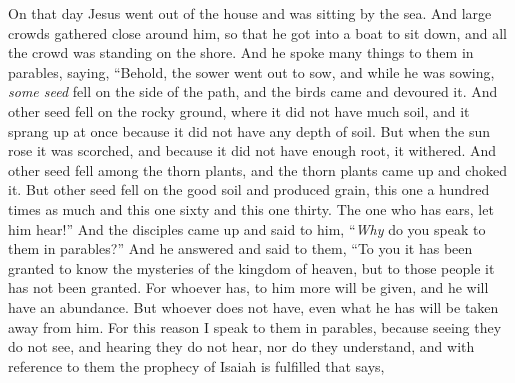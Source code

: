 \begin{biblechapter} %
 On that day Jesus went out of the house and was sitting by the sea.
\verse And large crowds gathered close around him, so that he got into a boat to sit down, and all the crowd was standing on the shore.
\verse And he spoke many things to them in parables, saying, “Behold, the sower went out to sow,
\verse and while he was sowing, \textit{some seed} fell on the side of the path, and the birds came and devoured it.
\verse And other seed fell on the rocky ground, where it did not have much soil, and it sprang up at once because it did not have any depth of soil.
\verse But when the sun rose it was scorched, and because it did not have enough root, it withered.
\verse And other seed fell among the thorn plants, and the thorn plants came up and choked it.
\verse But other seed fell on the good soil and produced grain, this one a hundred times as much and this one sixty and this one thirty.
\verse The one who has ears, let him hear!”
 And the disciples came up and said to him, “\textit{Why} do you speak to them in parables?”
\verse And he answered and said to them, “To you it has been granted to know the mysteries of the kingdom of heaven, but to those people it has not been granted.
\verse For whoever has, to him more will be given, and he will have an abundance. But whoever does not have, even what he has will be taken away from him.
\verse For this reason I speak to them in parables, because seeing they do not see, and hearing they do not hear, nor do they understand,
\verse and with reference to them the prophecy of Isaiah is fulfilled that says,

\end{biblechapter}
